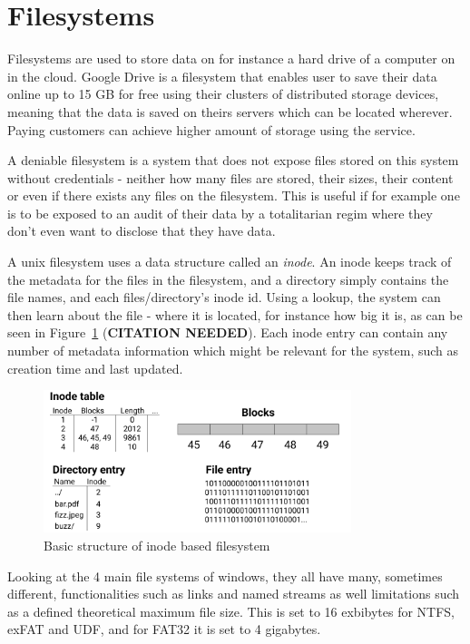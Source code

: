 \section{Filesystems}
Filesystems are used to store data on for instance a hard drive of a computer on in the cloud. Google Drive is a filesystem that enables user to save their data online up to 15 GB for free\cite{CloudStorageWork} using their clusters of distributed storage devices, meaning that the data is saved on theirs servers which can be located wherever\cite{DistributedStorageWhat}. Paying customers can achieve higher amount of storage using the service.

A deniable filesystem is a system that does not expose files stored on this system without credentials - neither how many files are stored, their sizes, their content or even if there exists any files on the filesystem\cite{petersDEFYDeniableFile2014}. This is useful if for example one is to be exposed to an audit of their data by a totalitarian regim where they don't even want to disclose that they have data.

A unix filesystem uses a data structure called an \textit{inode}. An inode keeps track of the metadata for the files in the filesystem, and a directory simply contains the file names, and each files/directory's inode id. Using a lookup, the system can then learn about the file - where it is located, for instance how big it is, as can be seen in Figure~\ref{fig:inode_diag} (\textbf{CITATION NEEDED}). Each inode entry can contain any number of metadata information which might be relevant for the system, such as creation time and last updated.

\begin{figure}[!ht]
	\begin{center}
	  \includegraphics[width=0.8\textwidth]{figures/inode_diagram.png}
	\end{center}
	\caption{Basic structure of inode based filesystem}
	\label{fig:inode_diag}
\end{figure}

Looking at the 4 main file systems of windows, they all have many, sometimes different, functionalities such as links and named streams as well limitations such as a defined theoretical maximum file size\cite{mikbenFileSystemFunctionality}. This is set to 16 exbibytes for NTFS, exFAT and UDF, and for FAT32 it is set to 4 gigabytes. 